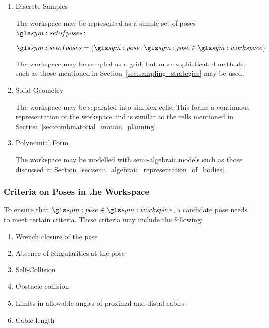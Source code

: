 			\begin{enumerate}

				\item Discrete Samples

					The workspace may be  represented  as  a  simple  set  of
					poses $\setofposes$:

					\begin{equation}
						\setofposes =
							\left\{
								\pose
								\,\middle|\,
								\pose\in\workspace
							\right\}
					\end{equation}

					The workspace may be sampled as a grid, but  more
					sophisticated methods, such as those mentioned in
					Section~\ref{sec:sampling_strategies} may be used.

				\item Solid Geometry

					The workspace may be separated into simplex cells.	This
					forms a continuous representation of the workspace and is
					similar to the cells mentioned in
					Section~\ref{sec:combinatorial_motion_planning}.

				\item Polynomial Form

					The workspace may be modelled with semi-algebraic models
					such as those discussed in
					Section~\ref{sec:semi_algebraic_representation_of_bodies}.

			\end{enumerate}

		\subsubsection{Criteria on Poses in the Workspace}%
		\label{sec:criteria_on_poses_in_the_workspace}

			To ensure that $\pose\in\workspace$, a	candidate  pose  needs	to
			meet certain criteria.  These criteria may  include	the
			following:

			\begin{enumerate}

				\item Wrench closure of the pose

				\item Absence of Singularities at the pose

				\item Self-Collision

				\item Obstacle collision

				\item Limits in allowable  angles  of  proximal  and  distal
					cables

				\item Cable length


			\end{enumerate}

